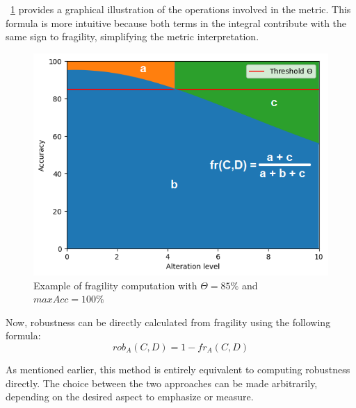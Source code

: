 \Fig~\ref{fig:frag_example} provides a graphical illustration of the operations involved in the metric. This formula is more intuitive because both terms in the integral contribute with the same sign to fragility, simplifying the metric interpretation.
\begin{figure}[h]
	\centering
	\includegraphics[width=0.7\linewidth]{ImageFiles/ANNRob/frag_example}
	\caption{Example of fragility computation with $\Theta=85\%$ and $maxAcc = 100\%$}
	\label{fig:frag_example}
\end{figure}

Now, robustness can be directly calculated from fragility using the following formula:
\[
	rob_A(C,D) = 1 - fr_A(C,D)
\]

As mentioned earlier, this method is entirely equivalent to computing robustness directly. The choice between the two approaches can be made arbitrarily, depending on the desired aspect to emphasize or measure.